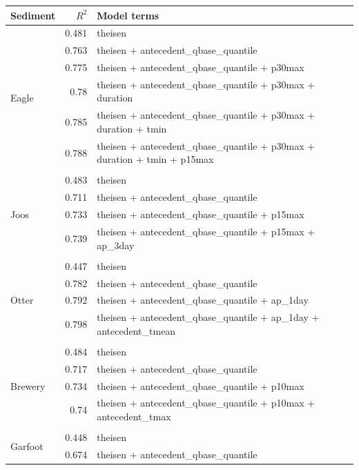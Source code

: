 \documentclass[10pt]{article}
\begin{document}
\begin{table}[h] \small
    \begin{center}
    \begin{tabular}{lrl}
    \textbf{Sediment} & $R^2$ & Model terms \\
    \hline
\multirow{7}{*}{Eagle} & 0.481 & theisen\\ 
 & 0.763 & theisen + antecedent\_qbase\_quantile\\ 
 & 0.775 & theisen + antecedent\_qbase\_quantile + p30max\\ 
 & 0.78 & theisen + antecedent\_qbase\_quantile + p30max + duration\\ 
 & 0.785 & theisen + antecedent\_qbase\_quantile + p30max + duration + tmin\\ 
 & 0.788 & theisen + antecedent\_qbase\_quantile + p30max + duration + tmin + p15max\\ 
\vspace{2mm}\\ \multirow{5}{*}{Joos} & 0.483 & theisen\\ 
 & 0.711 & theisen + antecedent\_qbase\_quantile\\ 
 & 0.733 & theisen + antecedent\_qbase\_quantile + p15max\\ 
 & 0.739 & theisen + antecedent\_qbase\_quantile + p15max + ap\_3day\\ 
\vspace{2mm}\\ \multirow{5}{*}{Otter} & 0.447 & theisen\\ 
 & 0.782 & theisen + antecedent\_qbase\_quantile\\ 
 & 0.792 & theisen + antecedent\_qbase\_quantile + ap\_1day\\ 
 & 0.798 & theisen + antecedent\_qbase\_quantile + ap\_1day + antecedent\_tmean\\ 
\vspace{2mm}\\ \multirow{5}{*}{Brewery} & 0.484 & theisen\\ 
 & 0.717 & theisen + antecedent\_qbase\_quantile\\ 
 & 0.734 & theisen + antecedent\_qbase\_quantile + p10max\\ 
 & 0.74 & theisen + antecedent\_qbase\_quantile + p10max + antecedent\_tmax\\ 
\vspace{2mm}\\ \multirow{5}{*}{Garfoot} & 0.448 & theisen\\ 
 & 0.674 & theisen + antecedent\_qbase\_quantile\\ 

\end{tabular}
\end{center}
\end{table}
\end{document}
